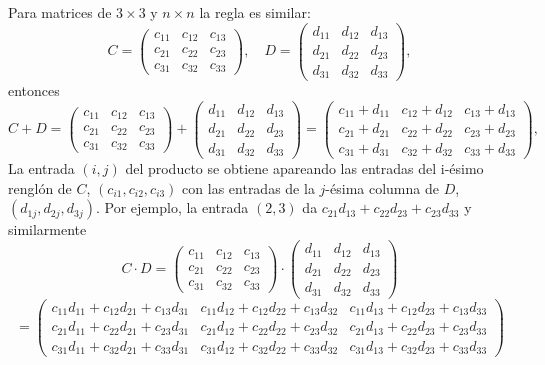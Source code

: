 Para matrices de $3\times 3$ y $n\times n$ la regla es similar:
$$C=\left(\begin{array}{ccc}
c_{11}&c_{12}&c_{13} \\
c_{21}&c_{22}&c_{23} \\
c_{31}&c_{32}&c_{33}  
\end{array}\right),
\quad 
D=\left(\begin{array}{ccc}
d_{11}&d_{12}&d_{13} \\
d_{21}&d_{22}&d_{23} \\
d_{31}&d_{32}&d_{33}  
\end{array}\right),$$
entonces 
$$C+D=\left(\begin{array}{ccc}
c_{11}&c_{12}&c_{13} \\
c_{21}&c_{22}&c_{23} \\
c_{31}&c_{32}&c_{33}  
\end{array}\right)
+
\left(\begin{array}{ccc}
d_{11}&d_{12}&d_{13} \\
d_{21}&d_{22}&d_{23} \\
d_{31}&d_{32}&d_{33}  
\end{array}\right)= 
\left(\begin{array}{ccc}
c_{11}+d_{11}&c_{12}+d_{12}&c_{13}+d_{13} \\
c_{21}+d_{21}&c_{22}+d_{22}&c_{23}+d_{23} \\
c_{31}+d_{31}&c_{32}+d_{32}&c_{33}+d_{33}  
\end{array}\right)
,$$
La entrada $(i,j)$ del producto se obtiene apareando las entradas del i-ésimo renglón de $C$, $(c_{i1},c_{i2},c_{i3})$ con las entradas de la $j$-ésima columna de $D$, $(d_{1j},d_{2j}, d_{3j})$. Por ejemplo, la entrada $(2,3)$ da $c_{21}d_{13}+c_{22}d_{23}+c_{23}d_{33}$ y similarmente 
$$C\cdot 
D=\left(\begin{array}{ccc}
c_{11}&c_{12}&c_{13} \\
c_{21}&c_{22}&c_{23} \\
c_{31}&c_{32}&c_{33}  
\end{array}\right)\cdot
\left(\begin{array}{ccc}
d_{11}&d_{12}&d_{13} \\
d_{21}&d_{22}&d_{23} \\
d_{31}&d_{32}&d_{33}  
\end{array}\right)$$
$$
=\left(\begin{array}{ccc}
c_{11}d_{11}+c_{12}d_{21}+c_{13}d_{31}  &  c_{11}d_{12}+c_{12}d_{22}+c_{13}d_{32}  &  c_{11}d_{13}+c_{12}d_{23}+c_{13}d_{33} \\
c_{21}d_{11}+c_{22}d_{21}+c_{23}d_{31}  &  c_{21}d_{12}+c_{22}d_{22}+c_{23}d_{32}  &  c_{21}d_{13}+c_{22}d_{23}+c_{23}d_{33}   \\
c_{31}d_{11}+c_{32}d_{21}+c_{33}d_{31}  &  c_{31}d_{12}+c_{32}d_{22}+c_{33}d_{32}  &  c_{31}d_{13}+c_{32}d_{23}+c_{33}d_{33}  
\end{array}\right)
$$


